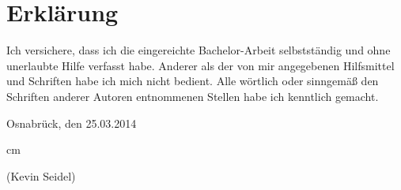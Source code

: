 \documentclass{AGTI}
\begin{document}
%
%
%
%

%
%
%
%

%
%

%


\clearpage

\appendix

\cleardoublepage

  \vspace*{15cm}

  \chapter*{Erklärung}

  \thispagestyle{empty}

  Ich versichere, dass ich die eingereichte Bachelor-Arbeit selbstständig und ohne
  unerlaubte Hilfe verfasst habe. Anderer als der von mir angegebenen Hilfsmittel und
  Schriften habe ich mich nicht bedient. Alle wörtlich oder sinngemäß den Schriften
  anderer Autoren entnommenen Stellen habe ich kenntlich gemacht.

  \bigskip\bigskip

\begin{flushright}
Osnabrück, den 25.03.2014
\end{flushright}
 cm

 \bigskip
 \bigskip
 \bigskip
 \bigskip
 \bigskip

 (Kevin Seidel)
\end{document}
